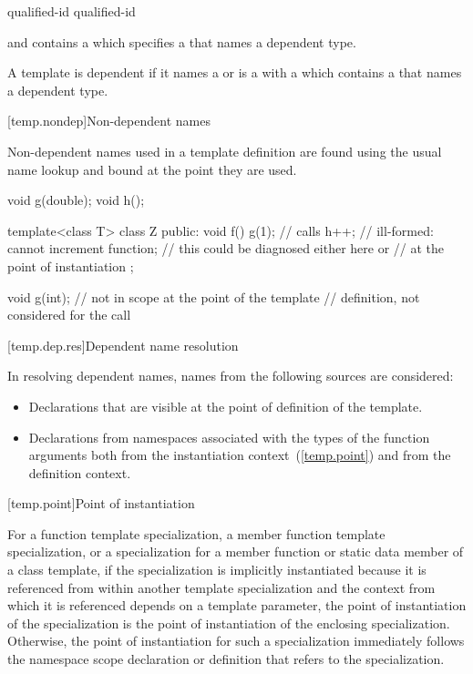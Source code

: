 \begin{ncbnftab}
qualified-id\br
\terminal{\&} qualified-id
\end{ncbnftab}

and contains a  which specifies a
 that names a dependent type.

\pnum
A template
is dependent if it names a
or is a
with a
which contains a
that names a dependent type.

[temp.nondep]{Non-dependent names}

\pnum
Non-dependent names used in a template definition are found using the
usual name lookup and bound at the point they are used.
\enterexample

\begin{codeblock}
void g(double);
void h();

template<class T> class Z {
public:
	void f() {
		g(1);		// calls 
		h++;		// ill-formed: cannot increment function;
				// this could be diagnosed either here or
				// at the point of instantiation
	}
};

void g(int);			// not in scope at the point of the template
				// definition, not considered for the call 
\end{codeblock}
\exitexampleb

[temp.dep.res]{Dependent name resolution}

\pnum
{}%
In resolving dependent names, names from the following sources are considered:

\begin{itemize}
\item
Declarations that are visible at the point of definition of the
template.
\item
Declarations from namespaces associated with the types of the
function arguments both from the instantiation context~(\ref{temp.point})
and from the definition context.
\end{itemize}

[temp.point]{Point of instantiation}

\pnum
{}%
For a function template specialization, a member function template
specialization, or a specialization for a member function or static data member
of a class template,
if the specialization is implicitly instantiated because it is referenced
from within another template specialization and
the context from which it is referenced depends on a template parameter,
the point of instantiation of the specialization is the point of instantiation
of the enclosing specialization.
Otherwise, the point of instantiation for such a specialization immediately
follows the namespace scope declaration
or definition that refers to the specialization.

